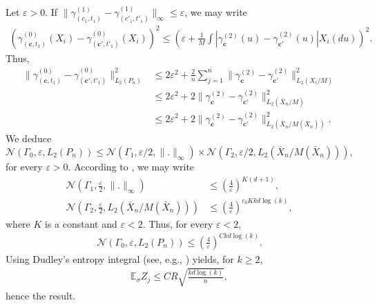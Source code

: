 \documentclass[noinfoline,preprint]{article}
\newcommand{\cb}{\mathbf{c}}
\renewcommand{\1}{\mathds 1}
\begin{document}
Let $\varepsilon>0$. If $ \|\gamma^{(1)}_{(c_1,t_1)} - \gamma^{(1)}_{(c'_1,t'_1)}\|_\infty \leq \varepsilon$, we may write
\begin{align*}
(\gamma^{(0)}_{(\cb,t_1)}(X_i) - \gamma^{(0)}_{(\cb',t'_1)}(X_i))^2 \leq \left ( \varepsilon + \frac{1}{M} \int  |\gamma^{(2)}_{\cb}(u)-\gamma^{(2)}_{\cb'}(u)|X_i(du)  \right )^2. 
\end{align*}
Thus, 
\begin{align*}
\| \gamma^{(0)}_{(\cb,t_1)} - \gamma^{(0)}_{(\cb',t'_1)} \|^2_{L_2(P_n)} & \leq 2 \varepsilon^2 + \frac{2}{n} \sum_{j=1}^n  \|\gamma^{(2)}_{\cb}-\gamma^{(2)}_{\cb'}\|^2_{L_2(X_i/M)} \\
& \leq 2 \varepsilon^2 + 2 \|\gamma^{(2)}_{\cb}-\gamma^{(2)}_{\cb'}\|^2_{L_2(\bar{X}_n/M)} \\
& \leq 2 \varepsilon^2 + 2 \|\gamma^{(2)}_{\cb}-\gamma^{(2)}_{\cb'}\|^2_{L_2(\bar{X}_n/M(\bar{X}_n))} . 
\end{align*}
We deduce
\[
\mathcal{N}(\Gamma_0,\varepsilon, L_2(P_n)) \leq \mathcal{N}(\Gamma_1, \varepsilon /2, \|.\|_\infty) \times \mathcal{N}(\Gamma_2, \varepsilon /2, L_2(\bar{X}_n/M(\bar{X}_n))),
\]
for every $\varepsilon >0$.  
According to \cite[Theorem 1]{Mendelson03}, we may write
\begin{align*}
\mathcal{N} \left ( \Gamma_1 , \frac{\varepsilon}{2}, \|.\|_\infty \right ) & \leq \left ( \frac{4}{\varepsilon} \right )^{K(d+1)}, \\
\mathcal{N} \left ( \Gamma_2 , \frac{\varepsilon}{2}, L_2(\bar{X}_n/M(\bar{X}_n)) \right ) & \leq \left ( \frac{4}{\varepsilon} \right )^{c_0 K kd \log(k)},
\end{align*}
where $K$ is a constant and $\varepsilon < 2$. Thus, for every $\varepsilon < 2$, 
\begin{align*}
\mathcal{N}\left ( \Gamma_0, \varepsilon, L_2(P_n) \right ) \leq \left ( \frac{4}{\varepsilon} \right )^{C kd \log(k)}.
\end{align*}
Using Dudley's entropy integral (see, e.g., \cite[Corollary 13.2]{Massart13}) yields, for $k\geq 2$,
\begin{align*}
\mathbb{E}_\sigma Z_j \leq C R \sqrt{\frac{kd \log(k)}{{n}}},
\end{align*}
hence the result.
\end{document}
